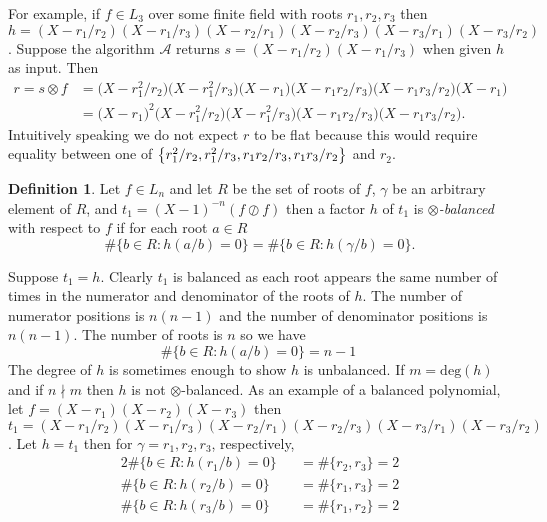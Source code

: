 \documentclass{article}
\let\originalleft\left
\let\originalright\right
\renewcommand{\left}{\mathopen{}\mathclose\bgroup\originalleft}
\renewcommand{\right}{\aftergroup\egroup\originalright}
\newcounter{dummy} \numberwithin{dummy}{section}
\theoremstyle{plain}
\theoremstyle{definition}
\newtheorem{mydef}[dummy]{Definition}
\def\mcA  {{ \mathcal{A}}}
\def\deg {{ \mathrm{deg}}}
\begin{document}
		For example, if $f \in L_3$ over some finite field with roots $r_1,r_2,r_3$ then $h=(X-r_1/r_2)(X-r_1/r_3)(X-r_2/r_1)(X-r_2/r_3)(X-r_3/r_1)(X-r_3/r_2)$. Suppose the algorithm $\mcA$ returns $s=(X-r_1/r_2)(X-r_1/r_3)$ when given $h$ as input. Then 
		\begin{align*}
		    r=s \otimes f &=\bigl(X-r_1^2/r_2 \bigr)\bigl(X-r_1^2/r_3 \bigr)\bigl(X-r_1 \bigr)\bigl(X-r_1r_2/r_3 \bigr) \bigl(X-r_1r_3/r_2 \bigr) \bigl(X-r_1 \bigl) \\
		                  &=\bigl(X-r_1 \bigr)^2 \bigl(X-r_1^2/r_2 \bigr) \bigl(X-r_1^2/r_3 \bigr)\bigl(X-r_1r_2/r_3\bigr)\bigl(X-r_1r_3/r_2\bigr). 
		\end{align*}		
		\noindent Intuitively speaking we do not expect $r$ to be flat because this would require equality between one of $\left\{ r_1^2/r_2, r_1^2/r_3, r_1r_2/r_3, r_1r_3/r_2 \right\}$ and $r_2$. 
		
		\begin{mydef}
		\label{DEF:balanced}
		    Let $f \in L_n$ and let $R$ be the set of roots of $f$, $\gamma$ be an arbitrary element of $R$, and $t_1=(X-1)^{-n}(f \oslash f)$ then a factor $h$ of $t_1$ is \emph{$\otimes$-balanced} with respect to $f$ if for each root $a \in R$ 
				\[ {\#} \{ b \in R : h(a/b)=0 \} = {\#} \{ b \in R : h(\gamma/b)=0 \}. \]				 
		\end{mydef}	
		
		Suppose $t_1=h$. Clearly $t_1$ is balanced as each root appears the same number of times in the numerator and denominator of the roots of $h$. The number of numerator positions is $n(n-1)$ and the number of denominator positions is $n(n-1)$. The number of roots is $n$ so we have 
    \begin{equation}
		    {\#} \{ b \in R : h(a/b)=0 \} = n-1 \
    \end{equation}
		The degree of $h$ is sometimes enough to show $h$ is unbalanced. If $m=\deg(h)$ and if $n \nmid m$ then $h$ is not $\otimes$-balanced. As an example of a balanced polynomial, let $f=(X-r_1)(X-r_2)(X-r_3)$ then $t_1=(X-r_1/r_2)(X-r_1/r_3)(X-r_2/r_1)(X-r_2/r_3)(X-r_3/r_1)(X-r_3/r_2)$. Let $h=t_1$ then for $\gamma=r_1,r_2,r_3$, respectively,
		\begin{alignat*}{2}
		    \#\{ b \in R : h(r_1/b)=0 \} &&=\#\{r_2,r_3 \}=2    \\
		    \#\{ b \in R : h(r_2/b)=0 \} &&=\#\{r_1,r_3 \}=2    \\
		    \#\{ b \in R : h(r_3/b)=0 \} &&=\#\{r_1,r_2 \}=2    
		\end{alignat*}
		
\end{document}
